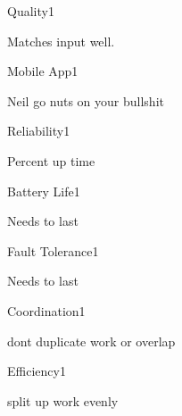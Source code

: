 \begin{nonfunctional_requirement}{Quality}{1}
\item Matches input well. 
\end{nonfunctional_requirement}

\begin{nonfunctional_requirement}{Mobile App}{1}
\item Neil go nuts on your bullshit
\end{nonfunctional_requirement}

\begin{nonfunctional_requirement}{Reliability}{1}
\item Percent up time
\end{nonfunctional_requirement}

\begin{nonfunctional_requirement}{Battery Life}{1}
\item Needs to last
\end{nonfunctional_requirement}

\begin{nonfunctional_requirement}{Fault Tolerance}{1}
\item Needs to last
\end{nonfunctional_requirement}

\begin{nonfunctional_requirement}{Coordination}{1}
\item dont duplicate work or overlap
\end{nonfunctional_requirement}

\begin{nonfunctional_requirement}{Efficiency}{1}
\item split up work evenly
\end{nonfunctional_requirement}
